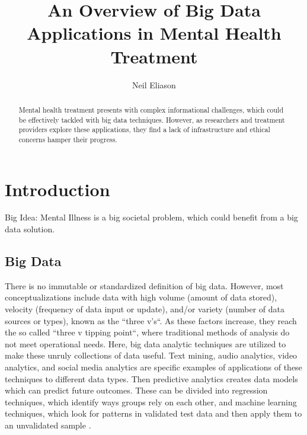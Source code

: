 \documentclass[sigconf]{acmart}
\begin{document}
\title{An Overview of Big Data Applications in Mental Health Treatment}


\author{Neil Eliason}


\renewcommand{\shortauthors}{Eliason}


\begin{abstract}
Mental health treatment presents with complex informational challenges, which could be effectively tackled with big data techniques. However, as researchers and treatment providers explore these applications, they find a lack of infrastructure and ethical concerns hamper their progress.

\end{abstract}



\maketitle

\section{Introduction}
Big Idea: Mental Illness is a big societal problem, which could benefit from a big data solution.

\subsection{Big Data}

There is no immutable or standardized definition of big data. However, most conceptualizations include data with high volume (amount of data stored), velocity (frequency of data input or update), and/or variety (number of data sources or types), known as the ``three v's``. As these factors increase, they reach the so called ``three v tipping point``, where traditional methods of analysis do not meet operational needs. Here, big data analytic techniques are utilized to make these unruly collections of data useful. Text mining, audio analytics, video analytics, and social media analytics are specific examples of applications of these techniques to different data types. Then predictive analytics creates data models which can predict future outcomes. These can be divided into regression techniques, which identify ways groups rely on each other, and machine learning techniques, which look for patterns in validated test data and then apply them to an unvalidated sample \cite{bdconcepts}.
\end{document}
